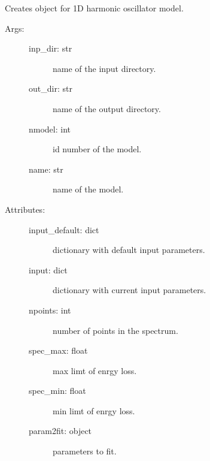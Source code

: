 \documentclass[letterpaper,10pt,english]{sphinxmanual}
\begin{document}

\begin{fulllineitems}
\label{\detokenize{modules/model:phlab.model.single_osc}}
Creates object for 1D harmonic oscillator model.
\begin{description}
\item[{Args:}] \leavevmode\begin{description}
\item[{inp\_dir: str}] \leavevmode
name of the input directory.

\item[{out\_dir: str}] \leavevmode
name of the output directory.

\item[{nmodel: int}] \leavevmode
id number of the model.

\item[{name: str}] \leavevmode
name of the model.

\end{description}

\item[{Attributes:}] \leavevmode\begin{description}
\item[{input\_default: dict}] \leavevmode
dictionary with default input parameters.

\item[{input: dict}] \leavevmode
dictionary with current input parameters.

\item[{npoints: int}] \leavevmode
number of points in the spectrum.

\item[{spec\_max: float}] \leavevmode
max limt of enrgy loss.

\item[{spec\_min: float}] \leavevmode
min limt of enrgy loss.

\item[{param2fit: object}] \leavevmode
parameters to fit.


\end{description}
\end{description}
\end{fulllineitems}
\end{document}

